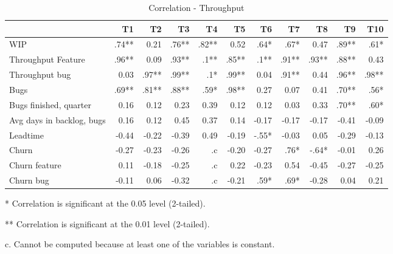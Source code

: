 \documentclass[UKenglish]{ifimaster}  %
\begin{document}
\begin{table}[!htbp]
 \begin{adjustwidth}{-2.5cm}{}
 \centering
 \begin{tabular}{|l|r|r|r|r|r|r|r|r|r|r|}
\hline
 & T1 & T2 & T3 & T4 & T5 & T6 & T7 & T8 & T9 & T10\\ \hline
WIP &.74**& 0.21& .76**& .82**& 0.52& .64*& .67*& 0.47& .89**& .61*\\ \hline
Throughput Feature &.96**& 0.09& .93**& .1**& .85**& .1**& .91**& .93**& .88**& 0.43\\ \hline
Throughput bug &0.03& .97**& .99**& .1*& .99**& 0.04& .91**& 0.44& .96**& .98**\\ \hline
Bugs &.69**& .81**& .88**& .59*& .98**& 0.27& 0.07& 0.41& .70**& .56*\\ \hline
Bugs finished, quarter &0.16& 0.12& 0.23& 0.39& 0.12& 0.12& 0.03& 0.33& .70**& .60*\\ \hline
Avg days in backlog, bugs &0.16& 0.12& 0.45& 0.37& 0.14& -0.17& -0.17& -0.17& -0.41& -0.09\\ \hline
Leadtime &-0.44& -0.22& -0.39& 0.49& -0.19& -.55*& -0.03& 0.05& -0.29& -0.13\\ \hline
Churn &-0.27& -0.23& -0.26& .c& -0.20& -0.27& .76*& -.64*& -0.01& 0.26\\ \hline
Churn feature &0.11& -0.18& -0.25& .c& 0.22& -0.23& 0.54& -0.45& -0.27& -0.25\\ \hline
Churn bug &-0.11& 0.06& -0.32& .c
& -0.21& .59*
& .69*
& -0.28& 0.04& 0.21\\ \hline
\end{tabular}
 \caption{Correlation - Throughput}
 \label{corr:TP}
 \centerline {* Correlation is significant at the 0.05 level (2-tailed).}
\centerline{** Correlation is significant at the 0.01 level (2-tailed).}
\centerline{c. Cannot be computed because at least one of the variables is constant.}
\end{adjustwidth}
\end{table}
\end{document}
